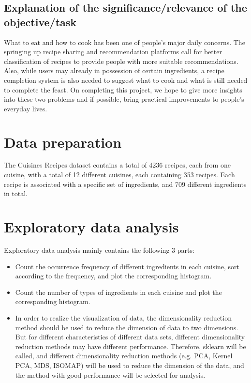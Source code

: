 \documentclass{article}
\begin{document}
\subsection{Explanation of the significance/relevance of the objective/task}
What to eat and how to cook has been one of people's major daily concerns. The springing up recipe sharing and recommendation platforms call for better classification of recipes to provide people with more suitable recommendations. Also, while users may already in possession of certain ingredients, a recipe completion system is also needed to suggest what to cook and what is still needed to complete the feast. On completing this project, we hope to give more insights into these two problems and if possible, bring practical improvements to people's everyday lives.

\section{Data preparation}
The Cuisines Recipes dataset contains a total of 4236 recipes, each from one cuisine, with a total of 12 different cuisines, each containing 353 recipes. Each recipe is associated with a specific set of ingredients, and 709 different ingredients in total.

\section{Exploratory data analysis}
Exploratory data analysis mainly contains the following 3 parts:
\begin{itemize}
\item Count the occurrence frequency of different ingredients in each cuisine, sort according to the frequency, and plot the corresponding histogram.
\item Count the number of types of ingredients in each cuisine and plot the corresponding histogram.
\item In order to realize the visualization of data, the dimensionality reduction method should be used to reduce the dimension of data to two dimensions. But for different characteristics of different data sets, different dimensionality reduction methods may have different performance. Therefore, sklearn will be called, and different dimensionality reduction methods (e.g. PCA, Kernel PCA, MDS, ISOMAP) will be used to reduce the dimension of the data, and the method with good performance will be selected for analysis.
\end{itemize}
\end{document}

